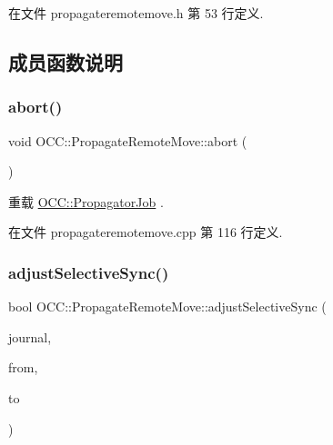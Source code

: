 在文件 propagateremotemove.\+h 第 53 行定义.



\subsection{成员函数说明}
\mbox{\label{class_o_c_c_1_1_propagate_remote_move_a7d8b531ca627952d2c8b81cd8b14674d}} 
\subsubsection{\texorpdfstring{abort()}{abort()}}
{\footnotesize\ttfamily void O\+C\+C\+::\+Propagate\+Remote\+Move\+::abort (\begin{DoxyParamCaption}{ }\end{DoxyParamCaption})\hspace{0.3cm}{\ttfamily [virtual]}}



重载 \hyperlink{class_o_c_c_1_1_propagator_job_a0d33573c817a705179a87db936b8dcb4}{O\+C\+C\+::\+Propagator\+Job} .



在文件 propagateremotemove.\+cpp 第 116 行定义.

\mbox{\label{class_o_c_c_1_1_propagate_remote_move_a7eb8e2df15545a657c3c533b19fcf699}} 
\subsubsection{\texorpdfstring{adjust\+Selective\+Sync()}{adjustSelectiveSync()}}
{\footnotesize\ttfamily bool O\+C\+C\+::\+Propagate\+Remote\+Move\+::adjust\+Selective\+Sync (\begin{DoxyParamCaption}\item[{\hyperlink{class_o_c_c_1_1_sync_journal_db}{Sync\+Journal\+Db} $\ast$}]{journal,  }\item[{const Q\+String \&}]{from,  }\item[{const Q\+String \&}]{to }\end{DoxyParamCaption})\hspace{0.3cm}{\ttfamily [static]}}

